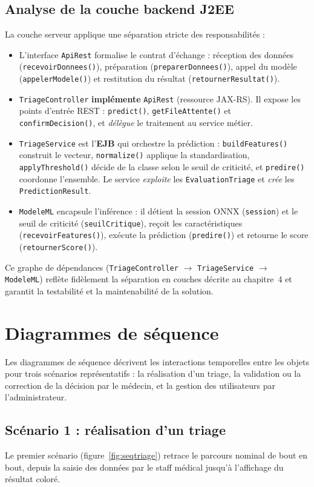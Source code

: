 \subsection{Analyse de la couche backend J2EE}
La couche serveur applique une séparation stricte des responsabilités :
\begin{itemize}
  \item L'interface \texttt{ApiRest} formalise le contrat d'échange : réception des données
  (\texttt{recevoirDonnees()}), préparation (\texttt{preparerDonnees()}), appel du modèle
  (\texttt{appelerModele()}) et restitution du résultat (\texttt{retournerResultat()}).
  \item \texttt{TriageController} \textbf{implémente} \texttt{ApiRest} (ressource JAX-RS). Il
  expose les points d'entrée REST : \texttt{predict()}, \texttt{getFileAttente()} et
  \texttt{confirmDecision()}, et \textit{délègue} le traitement au service métier.
  \item \texttt{TriageService} est l'\textbf{EJB} qui orchestre la prédiction :
  \texttt{buildFeatures()} construit le vecteur, \texttt{normalize()} applique la standardisation,
  \texttt{applyThreshold()} décide de la classe selon le seuil de criticité, et \texttt{predire()}
  coordonne l'ensemble. Le service \textit{exploite} les \texttt{EvaluationTriage} et \textit{crée}
  les \texttt{PredictionResult}.
  \item \texttt{ModeleML} encapsule l'inférence : il détient la session ONNX (\texttt{session})
  et le seuil de criticité (\texttt{seuilCritique}), reçoit les caractéristiques
  (\texttt{recevoirFeatures()}), exécute la prédiction (\texttt{predire()}) et retourne le score
  (\texttt{retournerScore()}).
\end{itemize}
Ce graphe de dépendances (\texttt{TriageController} $\rightarrow$ \texttt{TriageService}
$\rightarrow$ \texttt{ModeleML}) reflète fidèlement la séparation en couches décrite au
chapitre~4 et garantit la testabilité et la maintenabilité de la solution.

\section{Diagrammes de séquence}
Les diagrammes de séquence décrivent les interactions temporelles entre les objets pour trois
scénarios représentatifs : la réalisation d'un triage, la validation ou la correction de la
décision par le médecin, et la gestion des utilisateurs par l'administrateur.

\subsection{Scénario 1 : réalisation d'un triage}
Le premier scénario (figure~\ref{fig:seqtriage}) retrace le parcours nominal de bout en bout,
depuis la saisie des données par le staff médical jusqu'à l'affichage du résultat coloré.

